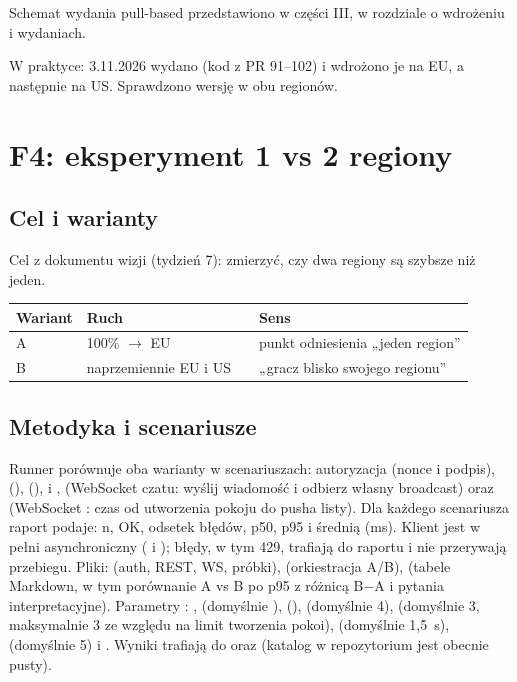Schemat wydania pull-based przedstawiono w części III, w rozdziale o wdrożeniu i wydaniach.

W praktyce: 3.11.2026 wydano  (kod z PR 91--102) i wdrożono je na EU, a następnie na US.
Sprawdzono wersję w  obu regionów.

\section{F4: eksperyment 1 vs 2 regiony}\label{sec:real-f4}

\subsection{Cel i warianty}
Cel z dokumentu wizji (tydzień 7): zmierzyć, czy dwa regiony są szybsze niż jeden.
\begin{table}[H]
\centering\small
\begin{tabularx}{\textwidth}{@{}lll Y@{}}
\toprule
\textbf{Wariant} & \textbf{Ruch} & & \textbf{Sens} \\
\midrule
A & 100\% $\rightarrow$ EU & & punkt odniesienia „jeden region'' \\
B & naprzemiennie EU i US & & „gracz blisko swojego regionu'' \\
\bottomrule
\end{tabularx}
\end{table}

\subsection{Metodyka i scenariusze}
Runner  porównuje oba warianty w scenariuszach: autoryzacja (nonce i podpis),
 (),  (),  i
,  (WebSocket czatu: wyślij wiadomość i odbierz własny broadcast) oraz
 (WebSocket : czas od utworzenia pokoju do pusha listy). Dla każdego
scenariusza raport podaje: n, OK, odsetek błędów, p50, p95 i średnią (ms). Klient jest w pełni asynchroniczny
( i ); błędy, w tym 429, trafiają do raportu i nie przerywają
przebiegu. Pliki:  (auth, REST, WS, próbki),  (orkiestracja A/B),
 (tabele Markdown, w tym porównanie A vs B po p95 z różnicą B$-$A i pytania interpretacyjne).
Parametry : ,  (domyślnie ),
 (),  (domyślnie 4),  (domyślnie 3,
maksymalnie 3 ze względu na limit tworzenia pokoi),  (domyślnie 1,5~s), 
(domyślnie 5) i . Wyniki trafiają do  oraz 
(katalog w repozytorium jest obecnie pusty).

